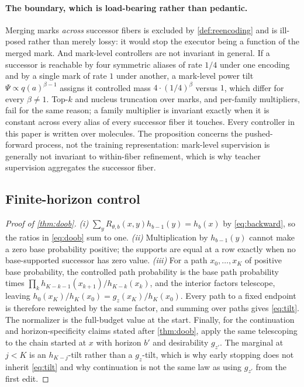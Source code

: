 \paragraph{The boundary, which is load-bearing rather than pedantic.}
Merging marks \emph{across} successor fibers is excluded by \cref{def:reencoding} and is ill-posed rather than merely lossy: it would stop the executor being a function of the merged mark.
And mark-level controllers are not invariant in general.
If a successor is reachable by four symmetric aliases of rate $1/4$ under one encoding and by a single mark of rate $1$ under another, a mark-level power tilt $\Psi\propto q(a)^{\beta-1}$ assigns it controlled mass $4\cdot(1/4)^\beta$ versus $1$, which differ for every $\beta\ne1$.
Top-$k$ and nucleus truncation over marks, and per-family multipliers, fail for the same reason; a family multiplier is invariant exactly when it is constant across every alias of every successor fiber it touches.
Every controller in this paper is written over molecules.
The proposition concerns the pushed-forward process, not the training representation: mark-level supervision is generally not invariant to within-fiber refinement, which is why teacher supervision aggregates the successor fiber.

\subsection{Finite-horizon control}

\begin{proof}[Proof of \cref{thm:doob}]
\emph{(i)} $\sum_y R_{\theta,b}(x,y)h_{b-1}(y)=h_b(x)$ by \eqref{eq:backward}, so the ratios in \eqref{eq:doob} sum to one.
\emph{(ii)} Multiplication by $h_{b-1}(y)$ cannot make a zero base probability positive; the supports are equal at a row exactly when no base-supported successor has zero value.
\emph{(iii)} For a path $x_0,\dots,x_K$ of positive base probability, the controlled path probability is the base path probability times $\prod_{k}h_{K-k-1}(x_{k+1})/h_{K-k}(x_k)$, and the interior factors telescope, leaving $h_0(x_K)/h_K(x_0)=g_z(x_K)/h_K(x_0)$. Every path to a fixed endpoint is therefore reweighted by the same factor, and summing over paths gives \eqref{eq:tilt}. The normalizer is the full-budget value at the start.
Finally, for the continuation and horizon-specificity claims stated after \cref{thm:doob}, apply the same telescoping to the chain started at $x$ with horizon $b'$ and desirability $g_{z'}$. The marginal at $j<K$ is an $h_{K-j}$-tilt rather than a $g_z$-tilt, which is why early stopping does not inherit \eqref{eq:tilt} and why continuation is not the same law as using $g_{z'}$ from the first edit.
\end{proof}

